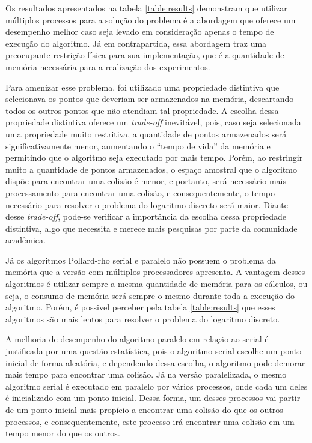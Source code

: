 Os resultados apresentados na tabela \ref{table:results} demonstram que utilizar múltiplos processos para a solução do problema é a abordagem que oferece um desempenho melhor caso seja levado em consideração apenas o tempo de execução do algoritmo. Já em contrapartida, essa abordagem traz uma preocupante restrição física para sua implementação, que é a quantidade de memória necessária para a realização dos experimentos.

Para amenizar esse problema, foi utilizado uma propriedade distintiva que selecionava os pontos que deveriam ser armazenados na memória, descartando todos os outros pontos que não atendiam tal propriedade. A escolha dessa propriedade distintiva oferece um \textit{trade-off} inevitável, pois, caso seja selecionada uma propriedade muito restritiva, a quantidade de pontos armazenados será significativamente menor, aumentando o ``tempo de vida'' da memória e permitindo que o algoritmo seja executado por mais tempo. Porém, ao restringir muito a quantidade de pontos armazenados, o espaço amostral que o algoritmo dispõe para encontrar uma colisão é menor, e portanto, será necessário mais processamento para encontrar uma colisão, e consequentemente, o tempo necessário para resolver o problema do logaritmo discreto será maior. Diante desse \textit{trade-off}, pode-se verificar a importância da escolha dessa propriedade distintiva, algo que necessita e merece mais pesquisas por parte da comunidade acadêmica.

Já os algoritmos Pollard-rho serial e paralelo não possuem o problema da memória que a versão com múltiplos processadores apresenta. A vantagem desses algoritmos é utilizar sempre a mesma quantidade de memória para os cálculos, ou seja, o consumo de memória será sempre o mesmo durante toda a execução do algoritmo. Porém, é possivel perceber pela tabela \ref{table:results} que esses algoritmos são mais lentos para resolver o problema do logaritmo discreto.

A melhoria de desempenho do algoritmo paralelo em relação ao serial é justificada por uma questão estatística, pois o algoritmo serial escolhe um ponto inicial de forma aleatória, e dependendo dessa escolha, o algoritmo pode demorar mais tempo para encontrar uma colisão. Já na versão paralelizada, o mesmo algoritmo serial é executado em paralelo por vários processos, onde cada um deles é inicializado com um ponto inicial. Dessa forma, um desses processos vai partir de um ponto inicial mais propício a encontrar uma colisão do que os outros processos, e consequentemente, este processo irá encontrar uma colisão em um tempo menor do que os outros.

